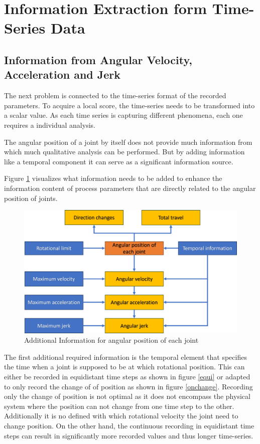 \section{Information Extraction form Time-Series Data}\label{extraction}
\subsection{Information from Angular Velocity, Acceleration and Jerk}
The next problem is connected to the time-series format of the recorded parameters. To acquire a local score, the time-series needs to be transformed into a scalar value.
As each time series is capturing different phenomena, each one requires a individual analysis.


The angular position of a joint by itself does not provide much information from which much qualitative analysis can be performed. But by adding information like a temporal component it can serve as a significant information source. 

Figure \ref{agularstuff} visualizes what information needs to be added to enhance the information content of process parameters that are directly related to the angular position of joints.

\begin{figure}[H]
	\centerline{\includegraphics[scale=.55]{figures/angularstuff.png}}
	\caption{Additional Information for angular position of each joint}
	\label{agularstuff}
\end{figure}



The first additional required information is the temporal element that specifies the time when a joint is supposed to be at which rotational position. This can either be recorded in equidistant time steps as shown in figure \ref{equi} or adapted to only record the change of of position as shown in figure \ref{onchange}. Recording only the change of position is not optimal as it does not encompass the physical system where the position can not change from one time step to the other. Additionally it is no defined with which rotational velocity the joint need to change position. On the other hand, the continuous recording in equidistant time steps can result in significantly more recorded values and thus longer time-series.

